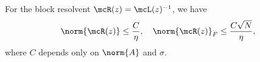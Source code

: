 \begin{corollary}\label{cor:block-resolvent-bounds}
For the block resolvent $\mcR(z) = \mcL(z)^{-1}$, we have
\[
\norm{\mcR(z)} \leq \frac{C}{\eta}, \quad
\norm{\mcR(z)}_F \leq \frac{C\sqrt{N}}{\eta},
\]
where $C$ depends only on $\norm{A}$ and $\sigma$.
\end{corollary}

